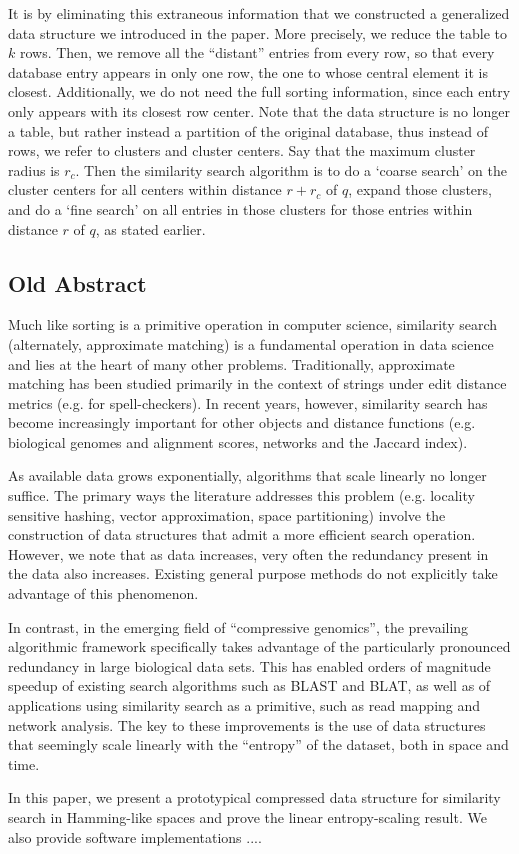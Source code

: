 \documentclass[review,preprint,12pt]{elsarticle}
\theoremstyle{definition}
\theoremstyle{remark}
\numberwithin{equation}{section}
\begin{document}
It is by eliminating this extraneous information that we constructed a generalized data structure we introduced in the paper.
More precisely, we reduce the table to $k$ rows.
Then, we remove all the ``distant'' entries from every row, so that every database entry appears in only one row, the one to whose central element it is closest.
Additionally, we do not need the full sorting information, since each entry only appears with its closest row center.
Note that the data structure is no longer a table, but rather instead a partition of the original database, thus instead of rows, we refer to clusters and cluster centers.
Say that the maximum cluster radius is $r_c$.
Then the similarity search algorithm is to do a `coarse search' on the cluster centers for all centers within distance $r+r_c$ of $q$, expand those clusters, and do a ‘fine search’ on all entries in those clusters for those entries within distance $r$ of $q$, as stated earlier.

\subsection{Old Abstract}

Much like sorting is a primitive operation in computer science, similarity
search (alternately, approximate matching) is a fundamental operation in data
science and lies at the heart of many other problems.
Traditionally, approximate matching has been studied primarily in the context
of strings under edit distance metrics (e.g. for spell-checkers).
In recent years, however, similarity search has become increasingly important
for other objects and distance functions (e.g. biological genomes and alignment
scores, networks and the Jaccard index).

As available data grows exponentially, algorithms that scale linearly no longer
suffice.
The primary ways the literature addresses this problem (e.g. locality sensitive
hashing, vector approximation, space partitioning) involve the construction of
data structures that admit a more efficient search operation.
However, we note that as data increases, very often the redundancy present in
the data also increases.
Existing general purpose methods do not explicitly take advantage of this
phenomenon.


In contrast, in the emerging field of ``compressive genomics'', the prevailing
algorithmic framework specifically takes advantage of the particularly
pronounced redundancy in large biological data sets.
This has enabled orders of magnitude speedup of existing search algorithms such
as BLAST and BLAT, as well as of applications using similarity search as a
primitive, such as read mapping and network analysis.
The key to these improvements is the use of data structures that seemingly
scale linearly with the ``entropy'' of the dataset, both in space and time.

In this paper, we present a prototypical compressed data structure for
similarity search in Hamming-like spaces and prove the linear entropy-scaling
result.
We also provide software implementations ....
\end{document}

